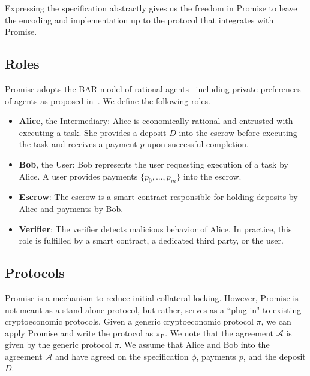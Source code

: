 \documentclass[runningheads]{llncs}
\newcommand{\sys}{Promise\xspace}
\newcommand{\rk}[1]{\todo[linecolor=red,backgroundcolor=red!25,bordercolor=blue,inline,caption={}]{Comment by Rami: #1}}
\newcommand{\dom}[1]{\todo[linecolor=green,backgroundcolor=green!25,bordercolor=green,inline,caption={}]{Comment by Dominik: #1}}
\begin{document}
Expressing the specification abstractly gives us the freedom in \sys to leave the encoding and implementation up to the protocol that integrates with \sys.


\subsection{Roles}

\sys adopts the BAR model of rational agents~\cite{aiyer2005bar} including private preferences of agents as proposed in~\cite{Harz2019Balance}.
We define the following roles.

\begin{itemize}
    \item \textbf{Alice}, the Intermediary: Alice is economically rational and entrusted with executing a task. She provides a deposit $D$ into the escrow before executing the task and receives a payment $p$ upon successful completion.
    \item \textbf{Bob}, the User: Bob represents the user requesting execution of a task by Alice. A user provides payments $\{p_0, ..., p_m\}$ into the escrow. %
    \item \textbf{Escrow}: The escrow is a smart contract responsible for holding deposits by Alice and payments by Bob.
    \item \textbf{Verifier}: The verifier detects malicious behavior of Alice. In practice, this role is fulfilled by a smart contract, a dedicated third party, or the user.
\end{itemize}






\subsection{Protocols}
\sys is a mechanism to reduce initial collateral locking.
However, \sys is not meant as a stand-alone protocol, but rather, serves as a ``plug-in" to existing cryptoeconomic protocols.
Given a generic cryptoeconomic protocol $\pi$, we can apply \sys and write the protocol as $\pi_{\mathrm{P}}$.
We note that the agreement $\mathcal{A}$ is given by the generic protocol $\pi$.
We assume that Alice and Bob into the agreement $\mathcal{A}$ and have agreed on the specification $\phi$, payments $p$, and the deposit $D$.
\end{document}
